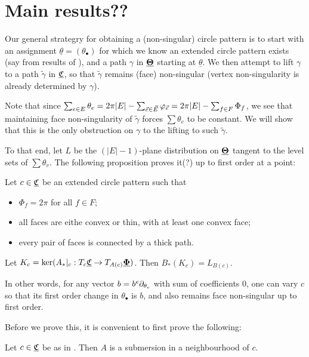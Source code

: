 \section{Main results??}


Our general strategry for obtaining a (non-singular) circle pattern
is to start with an assignment $\underline{\theta} = (\theta_\bullet)$
for which we know an extended circle pattern exists
(say from results of ),
and a path $\gamma$ in ${\underline{\mathbf{\Theta}}}$ starting at $\underline{\theta}$.
We then attempt to lift $\gamma$ to a path $\tilde{\gamma}$ in ${\underline{\mathfrak{C}}}$,
so that $\tilde{\gamma}$ remains (face) non-singular
(vertex non-singularity is already determined by $\gamma$).

Note that since $\sum_{e\in E} \theta_e
= 2\pi |E| - \sum_{\vec{e} \in \vec{E}} \varphi_{\vec{e}}
= 2\pi |E| - \sum_{f\in F} \Phi_f$,
we see that maintaining face non-singularity of $\tilde{\gamma}$
forces $\sum \theta_e$ to be constant.
We will show that this is the only obstruction on $\gamma$
to the lifting to such $\tilde{\gamma}$.

To that end, let $L$ be the $(|E|-1)$-plane distribution on ${\underline{\mathbf{\Theta}}}$
tangent to the level sets of $\sum \theta_v$.
The following proposition proves it(?) up to first order at a point:


\begin{proposition}
\label{p:point_lift}
Let $c \in {\underline{\mathfrak{C}}}$ be an extended circle pattern such that
\begin{itemize}
	\item $\Phi_f = 2\pi$ for all $f\in F$;
	\item all faces are eithe convex or thin,
		with at least one convex face;
	\item every pair of faces is connected by a thick path.
\end{itemize}
Let $K_c = \ker (A_*|_c : T_c {\underline{\mathfrak{C}}} \to T_{A(c)} {\underline{\mathbf{\Phi}}})$.
Then $B_*(K_c) = L_{B(c)}$.

In other words, for any vector $b = b^e \partial_{\theta_e}$
with sum of coefficients 0, one can vary $c$ so that its
first order change in $\theta_\bullet$ is $b$,
and also remains face non-singular up to first order.
\end{proposition}


Before we prove this, it is convenient to first prove the following:

\begin{lemma}
Let $c \in {\underline{\mathfrak{C}}}$ be as in .
Then $A$ is a submersion in a neighbourhood of $c$.
\end{lemma}

